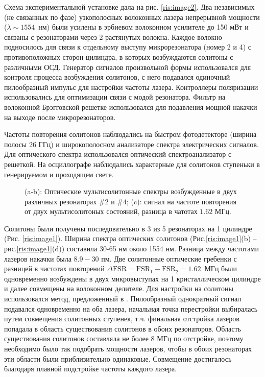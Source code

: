 Схема экспериментальной установке дала на рис. \ref{ris:image2}.  Два независимых (не связанных по фазе) узкополосных волоконных лазера непрерывной мощности ($\lambda \sim 1554$~нм) были усилены в эрбиевом волоконном усилителе до 150 мВт и связаны с резонаторами через 2 растянутых волокна. Каждое волокно подносилось для связи к отдельному выступу микрорезонатора (номер 2 и 4) с противоположных сторон цилиндра, в которых возбуждаются солитоны с различными ОСД. Генератор сигналов произвольной формы использовался для контроля процесса возбуждения солитонов, с него подавался одиночный пилообразный импульс для настройки частоты лазера. Контроллеры поляризации использовались для оптимизации связи с модой резонатора. Фильтр на волоконной Брэгговской решетке использовался для подавления мощной накачки на выходе после микрорезонаторов.

Частоты повторения солитонов наблюдались на быстром фотодетекторе (ширина полосы 26 ГГц) и широкополосном анализаторе спектра электрических сигналов. Для  оптического спектра использовался оптический спектроанализатор с решеткой. На осциллографе наблюдались характерные для солитонов ступеньки в генерируемом и проходящем свете.

\begin{figure}[ht]
\begin{minipage}[ht]{1\linewidth}
\end{minipage}
\caption{(a-b): Оптические мультисолитонные спектры возбужденные в двух различных резонаторах $\#2$ и $\#4$; (c): сигнал на частоте повторения от двух мультисолитоных состояний, разница в чатотах $1.62$ МГц.}
\label{ris:image3}
\end{figure}


Солитоны были получены последовательно в 3 из 5 резонаторах на 1 цилиндре (Рис. \ref{ris:image1}). Ширина спектра оптических солитонов (Рис.\ref{ris:image1}(b) -- рис.\ref{ris:image1}(d)) составила 30-65 нм около 1554 нм. Разница между частотами лазеров накачки была $8.9-30$ пм. Две солитонные оптические гребенки с разницей в частотах повторений $\Delta\mbox{FSR} = \mbox{FSR}_1 - \mbox{FSR}_2 = 1.62$~МГц были одновременно возбуждены в двух микровыступах на 1 кристаллическом цилиндре и далее совмещены на волоконном делителе. Для настройки на солитоны использовался метод, предложенный в \cite{Herr2014}. Пилообразный однократный сигнал подавался одновременно на оба лазера, начальная точка перестройки выбиралась путем совмещения солитонных ступенек, т.ч. финальная отстройка лазеров попадала в область существования солитонов в обоих резонаторов. Область существования солитонов составляла не более 8 МГц по отстройке, поэтому необходимо было так подобрать мощности лазеров, чтобы в обоих резонаторах эти области были приблизительно одинаковые. Совмещение достигалось благодаря плавной подстройке частоты каждого лазера.


